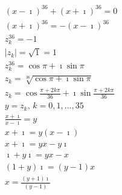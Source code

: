 \documentclass{article}
\begin{document}
    \begin{align*}
        (x - \imath) ^ {36} + (x + \imath) ^ {36} = 0\\
        (x + \imath) ^ {36} = -(x - \imath) ^ {36}\\
        z_k ^ {36} = -1\\
        |z_k| = \sqrt{1} = 1\\
        z_k ^ {36} = \cos\pi + \imath\sin\pi\\
        z_k = \sqrt[36]{\cos\pi + \imath\sin\pi}\\
        z_k = \cos{\frac{\pi + 2k\pi}{36}} + \imath\sin{\frac{\pi + 2k\pi}{36}}\\
        y = z_k,\, k = 0, 1, \dots, 35\\
        \frac{x + \imath}{x - \imath} = y\\
        x + \imath = y(x - \imath)\\
        x + \imath = yx - y\imath\\
        \imath + y\imath = yx - x\\
        (1 + y)\imath = (y - 1)x\\
        x = \frac{(y + 1)\imath}{(y - 1)}
    \end{align*}
\end{document}
